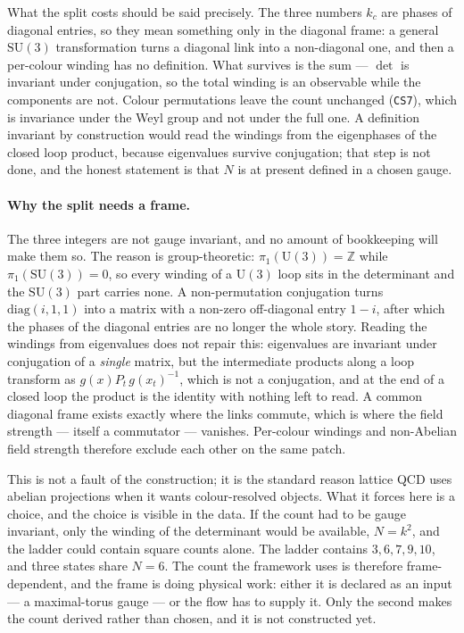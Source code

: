 \documentclass[aps,prd,preprint,superscriptaddress,amsmath,amssymb]{revtex4-2}
\begin{document}
What the split costs should be said precisely.  The three numbers $k_c$ are
phases of diagonal entries, so they mean something only in the diagonal
frame: a general $\mathrm{SU}(3)$ transformation turns a diagonal link into
a non-diagonal one, and then a per-colour winding has no definition.  What
survives is the sum --- $\det$ is invariant under conjugation, so the total
winding is an observable while the components are not.  Colour permutations
leave the count unchanged (\texttt{CS7}), which is invariance under the
Weyl group and not under the full one.  A definition invariant by
construction would read the windings from the eigenphases of the closed
loop product, because eigenvalues survive conjugation; that step is not
done, and the honest statement is that $N$ is at present defined in a
chosen gauge.

\paragraph{Why the split needs a frame.}
The three integers are not gauge invariant, and no amount of bookkeeping
will make them so.  The reason is group-theoretic: $\pi_1(\mathrm{U}(3))=\mathbb{Z}$
while $\pi_1(\mathrm{SU}(3))=0$, so every winding of a $\mathrm{U}(3)$ loop
sits in the determinant and the $\mathrm{SU}(3)$ part carries none.  A
non-permutation conjugation turns $\mathrm{diag}(i,1,1)$ into a matrix with
a non-zero off-diagonal entry $1-i$, after which the phases of the diagonal
entries are no longer the whole story.  Reading the windings from
eigenvalues does not repair this: eigenvalues are invariant under
conjugation of a \emph{single} matrix, but the intermediate products along a
loop transform as $g(x)P_t\,g(x_t)^{-1}$, which is not a conjugation, and at
the end of a closed loop the product is the identity with nothing left to
read.  A common diagonal frame exists exactly where the links commute,
which is where the field strength --- itself a commutator --- vanishes.
Per-colour windings and non-Abelian field strength therefore exclude each
other on the same patch.

This is not a fault of the construction; it is the standard reason lattice
QCD uses abelian projections when it wants colour-resolved objects.  What it
forces here is a choice, and the choice is visible in the data.  If the
count had to be gauge invariant, only the winding of the determinant would
be available, $N=k^2$, and the ladder could contain square counts alone.
The ladder contains $3,6,7,9,10$, and three states share $N=6$.  The count
the framework uses is therefore frame-dependent, and the frame is doing
physical work: either it is declared as an input --- a maximal-torus gauge
--- or the flow has to supply it.  Only the second makes the count derived
rather than chosen, and it is not constructed yet.
\end{document}
